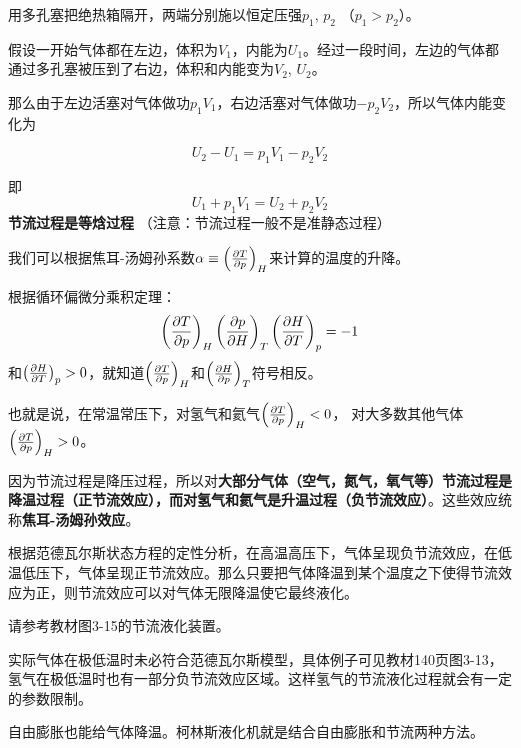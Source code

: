 \documentclass[CJK]{beamer}
\begin{document}
\begin{frame}
\bch

\emini
{}
用多孔塞把绝热箱隔开，两端分别施以恒定压强$p_1$, $p_2$ （$p_1>p_2$）。
\emini

{\small

假设一开始气体都在左边，体积为$V_1$，内能为$U_1$。经过一段时间，左边的气体都通过多孔塞被压到了右边，体积和内能变为$V_2$, $U_2$。

那么由于左边活塞对气体做功$p_1V_1$，右边活塞对气体做功$-p_2V_2$，所以气体内能变化为

$$U_2 - U_1  = p_1V_1 - p_2V_2$$

即
$$ U_1 + p_1V_1 = U_2 + p_2V_2 $$
{\blue \bf 节流过程是等焓过程} （注意：节流过程一般不是准静态过程）

}
\ech
\end{frame}


\begin{frame}
\bch
{\small
我们可以根据焦耳-汤姆孙系数$\alpha \equiv \left(\frac{\partial T}{\partial p}\right)_{H}$来计算的温度的升降。

根据循环偏微分乘积定理：
$$\left(\frac{\partial T}{\partial p}\right)_{H} \left(\frac{\partial p}{\partial H}\right)_{T} \left(\frac{\partial H}{\partial T}\right)_{p} = -1$$
和$\left(\frac{\partial H}{\partial T}\right)_{p} > 0$，就知道$\left(\frac{\partial T}{\partial p}\right)_{H}$和$\left(\frac{\partial H}{\partial p}\right)_{T}$符号相反。

也就是说，在常温常压下，对氢气和氦气$\left(\frac{\partial T}{\partial p}\right)_{H} < 0$， 对大多数其他气体$\left(\frac{\partial T}{\partial p}\right)_{H} > 0$。

因为节流过程是降压过程，所以对{\bf 大部分气体（空气，氮气，氧气等）节流过程是降温过程（正节流效应），而对氢气和氦气是升温过程（负节流效应）}。这些效应统称{\bf 焦耳-汤姆孙效应}。
}
\ech
\end{frame}


\begin{frame}
\bch
{\small
根据范德瓦尔斯状态方程的定性分析，在高温高压下，气体呈现负节流效应，在低温低压下，气体呈现正节流效应。那么只要把气体降温到某个温度之下使得节流效应为正，则节流效应可以对气体无限降温使它最终液化。

\skiplines

请参考教材图3-15的节流液化装置。

\skiplines

\bitem
\item{实际气体在极低温时未必符合范德瓦尔斯模型，具体例子可见教材140页图3-13，氢气在极低温时也有一部分负节流效应区域。这样氢气的节流液化过程就会有一定的参数限制。}
\item{自由膨胀也能给气体降温。柯林斯液化机就是结合自由膨胀和节流两种方法。}
\eitem

}
\ech
\end{frame}
\end{document}
